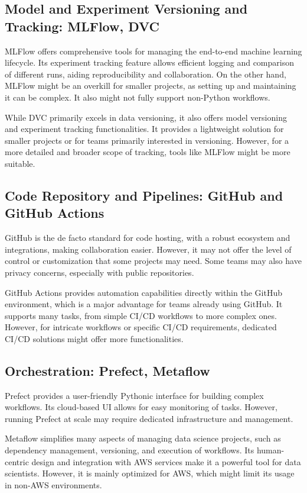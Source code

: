 \subsection{Model and Experiment Versioning and Tracking: MLFlow, DVC \label{model-versioning}}
MLFlow offers comprehensive tools for managing the end-to-end machine learning lifecycle. Its experiment tracking feature allows efficient logging and comparison of different runs, aiding reproducibility and collaboration. On the other hand, MLFlow might be an overkill for smaller projects, as setting up and maintaining it can be complex. It also might not fully support non-Python workflows.

While DVC primarily excels in data versioning, it also offers model versioning and experiment tracking functionalities. It provides a lightweight solution for smaller projects or for teams primarily interested in versioning. However, for a more detailed and broader scope of tracking, tools like MLFlow might be more suitable.

\subsection{Code Repository and Pipelines: GitHub and GitHub Actions \label{repo}}
GitHub is the de facto standard for code hosting, with a robust ecosystem and integrations, making collaboration easier. However, it may not offer the level of control or customization that some projects may need. Some teams may also have privacy concerns, especially with public repositories.

GitHub Actions provides automation capabilities directly within the GitHub environment, which is a major advantage for teams already using GitHub. It supports many tasks, from simple CI/CD workflows to more complex ones. However, for intricate workflows or specific CI/CD requirements, dedicated CI/CD solutions might offer more functionalities.

\subsection{Orchestration: Prefect, Metaflow \label{orchestration}}
Prefect provides a user-friendly Pythonic interface for building complex workflows. Its cloud-based UI allows for easy monitoring of tasks. However, running Prefect at scale may require dedicated infrastructure and management.

Metaflow simplifies many aspects of managing data science projects, such as dependency management, versioning, and execution of workflows. Its human-centric design and integration with AWS services make it a powerful tool for data scientists. However, it is mainly optimized for AWS, which might limit its usage in non-AWS environments.


